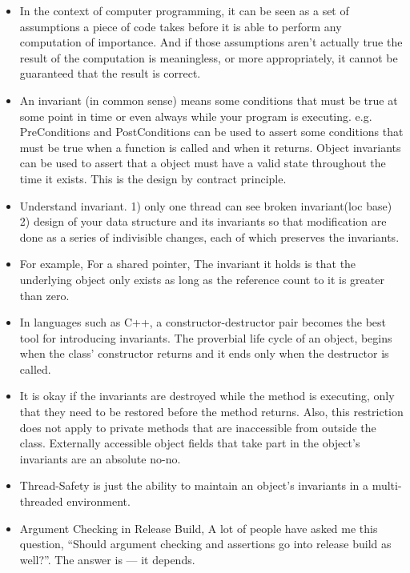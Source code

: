 \documentclass[a4paper,11pt,twoside]{book}
\begin{document}
\begin{itemize}
	\item In the context of computer programming, it can be seen as a set of assumptions a piece of code takes before it is able to perform any computation of importance. And if those assumptions aren’t actually true the result of the computation is meaningless, or more appropriately, it cannot be guaranteed that the result is correct. 
	
	\item An invariant (in common sense) means some conditions that must be true at some point in time or even always while your program is executing. e.g. PreConditions and PostConditions can be used to assert some conditions that must be true when a function is called and when it returns. Object invariants can be used to assert that a object must have a valid state throughout the time it exists. This is the design by contract principle.
	
	\item Understand invariant. 1) only one thread can see broken invariant(loc base) 2) design of your data structure and its invariants so that modification are done as a series of indivisible changes, each of which preserves the invariants. 
	
	
	\item For example, For a shared pointer, The invariant it holds is that the underlying object only exists as long as the reference count to it is greater than zero.
	
	\item In languages such as C++, a constructor-destructor pair becomes the best tool for introducing invariants. The proverbial life cycle of an object, begins when the class’ constructor returns and it ends only when the destructor is called.
	
	\item It is okay if the invariants are destroyed while the method is executing, only that they need to be restored before the method returns. Also, this restriction does not apply to private methods that are inaccessible from outside the class. Externally accessible object fields that take part in the object’s invariants are an absolute no-no.
	
	\item Thread-Safety is just the ability to maintain an object’s invariants in a multi-threaded environment.
	
	\item Argument Checking in Release Build, A lot of people have asked me this question, “Should argument checking and assertions go into release build as well?”. The answer is — it depends.
	

\end{itemize}
\end{document}
